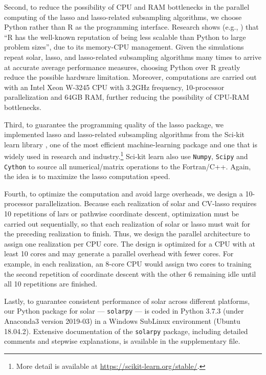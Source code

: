 \documentclass[12pt]{article}
\begin{document}
Second, to reduce the possibility of CPU and RAM bottlenecks in the parallel computing of the lasso and lasso-related subsampling algorithms, we choose Python rather than R as the programming interface. Research shows (e.g., \citet{donoho201750})  that ``R has the well-known reputation of being less scalable than Python to large problem sizes'', due to its memory-CPU management. Given the simulations repeat solar, lasso, and lasso-related subsampling algorithms many times to arrive at accurate average performance measures, choosing Python over R greatly reduce the possible hardware limitation. Moreover, computations are carried out with an Intel Xeon W-3245 CPU with 3.2GHz frequency, 10-processor parallelization and 64GB RAM, further reducing the possibility of CPU-RAM bottlenecks.

Third, to guarantee the programming quality of the lasso package, we implemented lasso and lasso-related subsampling algorithms from the {\sf Sci-kit learn} library \citep{scikit-learn}, one of the most efficient machine-learning package and one that is widely used in research and industry.\footnote{More detail is available at \url{https://scikit-learn.org/stable/}.} {\sf Sci-kit learn} also use \texttt{Numpy}, \texttt{Scipy} and \texttt{Cython} to source all numerical/matrix operations to the Fortran/C++. Again, the idea is to maximize the lasso computation speed.

Fourth, to optimize the computation and avoid large overheads, we design a 10-processor parallelization. Because each realization of solar and CV-lasso requires 10 repetitions of lars or pathwise coordinate descent, optimization must be carried out sequentially, so that each realization of solar or lasso must wait for the preceding realization to finish. Thus, we design the parallel architecture to assign one realization per CPU core. The design is optimized for a CPU with at least 10 cores and may generate a parallel overhead with fewer cores. For example, in each realization, an 8-core CPU would assign two cores to training the second repetition of coordinate descent with the other 6 remaining idle until all 10 repetitions are finished.

Lastly, to guarantee consistent performance of solar across different platforms, our Python package for solar --- \texttt{solarpy} --- is coded in Python 3.7.3 (under Anaconda3 version 2019-03) in a Windows SubLinux environment (Ubuntu 18.04.2). Extensive documentation of the \texttt{solarpy} package, including detailed comments and stepwise explanations, is available in the supplementary file.
\end{document}
